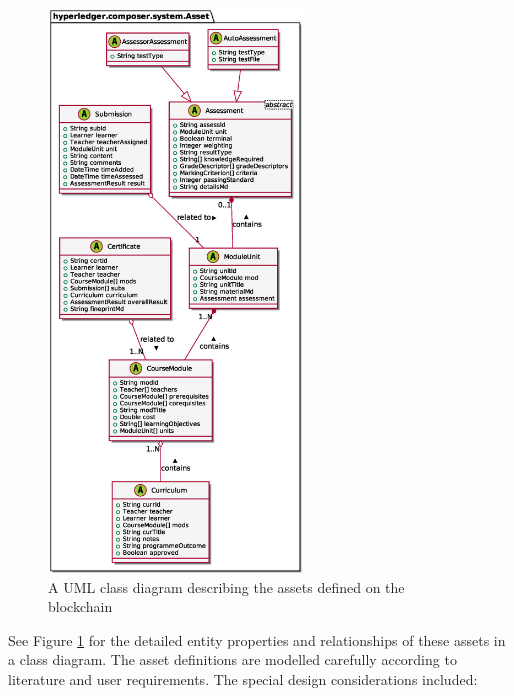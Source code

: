 \begin{figure}[!ht]
	\centering
	\includegraphics[width=0.6\textwidth]{assets}
	\caption[Assets Class Diagram]
	{A UML class diagram describing the assets defined on the blockchain}
	\label{fig:assets}
\end{figure}

See Figure \ref{fig:assets} for the detailed entity properties and relationships of these assets in a class diagram. 
The asset definitions are modelled carefully according to literature and user requirements.
The special design considerations included:

